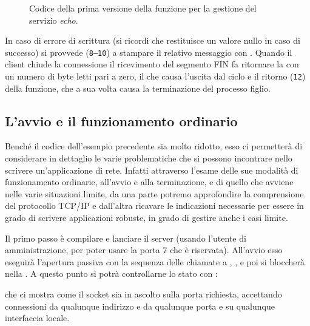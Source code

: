 \begin{figure}[!htb] 
  \footnotesize \centering
  \begin{minipage}[c]{\codesamplewidth}
  \end{minipage} 
  \normalsize
  \caption{Codice della prima versione della funzione  per la
    gestione del servizio \textit{echo}.}
  \label{fig:TCP_ServEcho_first}
\end{figure}

In caso di errore di scrittura (si ricordi che  restituisce un
valore nullo in caso di successo) si provvede (\texttt{\small 8--10}) a
stampare il relativo messaggio con .  Quando il client chiude
la connessione il ricevimento del segmento FIN fa ritornare la  con
un numero di byte letti pari a zero, il che causa l'uscita dal ciclo e il
ritorno (\texttt{\small 12}) della funzione, che a sua volta causa la
terminazione del processo figlio.


\subsection{L'avvio e il funzionamento ordinario}
\label{sec:TCP_echo_startup}

Benché il codice dell'esempio precedente sia molto ridotto, esso ci permetterà
di considerare in dettaglio le varie problematiche che si possono incontrare
nello scrivere un'applicazione di rete. Infatti attraverso l'esame delle sue
modalità di funzionamento ordinarie, all'avvio e alla terminazione, e di
quello che avviene nelle varie situazioni limite, da una parte potremo
approfondire la comprensione del protocollo TCP/IP e dall'altra ricavare le
indicazioni necessarie per essere in grado di scrivere applicazioni robuste,
in grado di gestire anche i casi limite.

Il primo passo è compilare e lanciare il server (usando l'utente di
amministrazione, per poter usare la porta 7 che è riservata). All'avvio esso
eseguirà l'apertura passiva con la sequenza delle chiamate a ,
,  e poi si bloccherà nella . A questo
punto si potrà controllarne lo stato con :
che ci mostra come il socket sia in ascolto sulla porta richiesta, accettando
connessioni da qualunque indirizzo e da qualunque porta e su qualunque
interfaccia locale.

